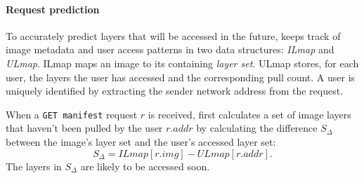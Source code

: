 \paragraph{Request prediction} %
%
To accurately predict layers that will be accessed in the future, \sysname keeps
track of image metadata and user access patterns in
two data structures:
%
\emph{ILmap} and \emph{ULmap}.
%
%
%
ILmap maps an image to its containing \emph{layer set}.
%
%
ULmap stores, for each user, the layers the user has accessed and the corresponding pull count.
A user is uniquely identified by extracting the sender network address from the request.
%

When a \texttt{GET manifest} request $r$ is received,
\sysname first calculates a set of image layers that haven't been pulled by the user $r.addr$ 
by calculating the difference $S_{\Delta}$ between the image's layer set and the user's accessed layer set:
%
\begin{equation*}
S_{\Delta} = ILmap[r.img] - ULmap[r.addr].
\end{equation*}
%
The layers in $S_{\Delta}$ are likely to be accessed soon.

